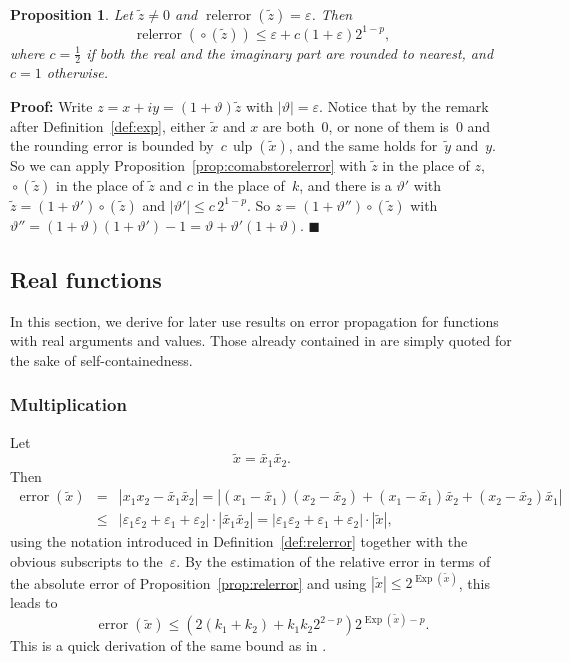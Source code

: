 \documentclass [11pt]{article}
\newcommand {\corr}[1]{{#1}}
\newcommand {\appro}[1]{\widetilde {#1}}
\newcommand {\Ulp}{{\operatorname {ulp}}}
\DeclareMathOperator{\Exp}{\operatorname {Exp}}
\newcommand{\error}{\operatorname {error}}
\newcommand{\relerror}{\operatorname {relerror}}
\newcommand {\round}{\operatorname {\circ}}
\renewcommand {\epsilon}{\varepsilon}
\renewcommand {\theta}{\vartheta}
\renewcommand {\leq}{\leqslant}
\newtheorem{prop}[theorem]{Proposition}
\newenvironment{proof}{\noindent \textbf {Proof:}}{{\hspace* {\fill}$\blacksquare$}}
\begin{document}
\begin {prop}
\label {prop:comrelround}
Let $\appro z \neq 0$ and $\relerror (\appro z) = \epsilon$.
Then
\[
\relerror (\round (\appro z)) \leq
\epsilon + c (1 + \epsilon) 2^{1-p},
\]
where $c = \frac {1}{2}$ if both the real and the imaginary part are
rounded to nearest, and $c = 1$ otherwise.
\end {prop}

\begin {proof}
Write $\corr z = \corr x + i \corr y = (1 + \theta) \appro z$
with $|\theta| = \epsilon$.
Notice that by the remark after Definition~\ref {def:exp}, either
$\appro x$ and $\corr x$ are both~$0$, or none of them is~$0$ and the
rounding error is bounded by~$c \, \Ulp (\appro x)$, and the same holds
for~$\appro y$ and~$\corr y$.
So we can apply
Proposition~\ref {prop:comabstorelerror} with $\appro z$ in the
place of $\corr z$, $\round (\appro z)$ in the place of $\appro z$
and $c$ in the place of~$k$, and
there is a $\theta'$ with $\appro z = (1 + \theta') \round (\appro z)$
and $|\theta'| \leq c \, 2^{1-p}$.
So $\corr z = (1 + \theta'') \round (\appro z)$ with
$\theta'' = (1 + \theta)(1 + \theta') - 1
= \theta + \theta' (1 + \theta)$.
\end {proof}


\subsection {Real functions}

In this section, we derive for later use results on error propagation for
functions with real arguments and values. Those already contained in
\cite{MPFRAlgorithms} are simply quoted for the sake of self-containedness.


\subsubsection {Multiplication}
\label {sssec:proprealmul}

Let
\[
\appro x = \appro {x_1} \appro {x_2}.
\]
Then
\begin {eqnarray*}
\error (\appro x)
& = & \left| \corr {x_1} \corr {x_2} - \appro {x_1} \appro {x_2} \right|
= \left|   (\corr {x_1} - \appro {x_1}) (\corr {x_2} - \appro {x_2})
         + (\corr {x_1} - \appro {x_1}) \appro {x_2}
         + (\corr {x_2} - \appro {x_2}) \appro {x_1}
         \right| \\
& \leq & |\epsilon_1 \epsilon_2 + \epsilon_1 + \epsilon_2|
      \cdot \left| \appro {x_1} \appro {x_2} \right|
= |\epsilon_1 \epsilon_2 + \epsilon_1 + \epsilon_2| \cdot |\appro x|,
\end {eqnarray*}
using the notation introduced in Definition~\ref {def:relerror} together
with the obvious subscripts to the~$\epsilon$.
By the estimation of the relative error in terms of the absolute error of
Proposition~\ref {prop:relerror} and using
$|\appro x| \leq 2^{\Exp (\appro x)}$, this leads to
\begin {equation}
\label {eq:proprealmul}
\error (\appro x)
\leq \left( 2 (k_1 + k_2) + k_1 k_2 2^{2-p} \right)
   2^{\Exp (\appro x) - p}.
\end {equation}
This is a quick derivation of the same bound as in
\cite[\S2.4]{MPFRAlgorithms}.
\end{document}

